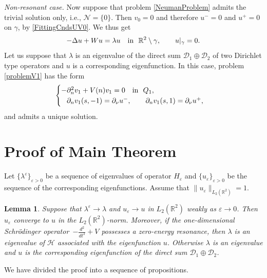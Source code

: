 \documentclass[reqno]{amsart}
\theoremstyle{plain}
\newtheorem{lem}{Lemma}
\numberwithin{equation}{section}
\newcommand{\Real}{\mathbb R}
\newcommand{\eps}{\varepsilon}
\newcommand{\cH}{\mathcal{H}}
\newcommand{\pte}{\partial_n}
\begin{document}
\textit{Non-resonant case.}
Now suppose that problem \eqref{NeumanProblem} admits the trivial solution only, i.e.,  $\mathcal{N}=\{0\}$.  Then $v_0=0$ and therefore $u^-=0$ and $u^+=0$ on $\gamma$, by \eqref{FittingCndsUV0}. We thus get
\begin{equation*}
-\Delta u+Wu=\lambda u\quad \hbox{in \ } \Real^2\setminus \gamma,\qquad
 u|_{\gamma}=0.
\end{equation*}
Let us suppose that $\lambda$ is an eigenvalue of the direct sum
$\mathcal{D}_1\oplus\mathcal{D}_2$ of two Dirichlet type operators and $u$ is a corresponding eigenfunction.
In this case, problem \eqref{problemV1} has the form
\begin{equation}\label{problemV1Non}
\begin{cases}
    -\pte^2 v_1+V(n)v_1=0\quad \hbox{in \ } Q_1, \\
    \phantom{-}\partial_n v_1(s, -1)=\partial_\nu u^-, \qquad
\partial_n v_1(s, 1)=\partial_\nu u^+,
\end{cases}
\end{equation}
and admits a unique solution.

\section{Proof of Main Theorem}
Let $\{\lambda^\eps\}_{\eps>0}$ be a sequence of eigenvalues of operator $H_\eps$ and $\{u_\eps\}_{\eps>0}$ be the sequence of the corresponding eigenfunctions. Assume that $\|u_\eps\|_{L_2(\Real^2)}=1$.


\begin{lem}\label{lemConvD}
  Suppose that $\lambda^\eps\to \lambda$ and $u_\eps\to u$ in $L_2(\Real^2)$ weakly as $\eps\to 0$. Then $u_\eps$ converge to $u$ in the $L_2(\Real^2)$-norm. Moreover, if the one-dimensional Schr\"odinger operator~$-\frac{d^2}{d t^2}+V$  possesses a zero-energy resonance, then $\lambda$ is an eigenvalue of $\cH$ associated with the eigenfunction $u$. Otherwise $\lambda$ is an eigenvalue and $u$ is the corresponding eigenfunction  of the direct sum $\mathcal{D}_1\oplus\mathcal{D}_2$.
\end{lem}


We have divided the proof into a sequence of propositions.
\end{document}
